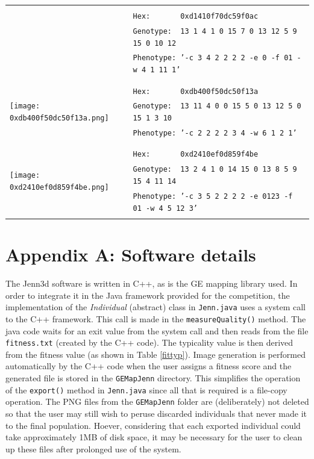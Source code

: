 \documentclass{article}
\begin{document}
\begin{center}
\begin{table}[h!!t]
\begin{tabular}{|l|l|}
		& \\
		& \texttt{Hex:\ \ \ \ \ \ \ 0xd1410f70dc59f0ac}\\
		& \texttt{Genotype:\ \ 13 1 4 1 0 15 7 0 13 12 5 9 15 0 10 12}\\
		& \texttt{Phenotype:\ '-c 3 4 2 2 2 2  -e 0 -f 01 -w 4 1 11 1'}\\
		& \\
		\hline
		\multirow{5}{*}{\texttt{[image: 0xdb400f50dc50f13a.png]}}
		& \\
		& \texttt{Hex:\ \ \ \ \ \ \ 0xdb400f50dc50f13a}\\
		& \texttt{Genotype:\ \ 13 11 4 0 0 15 5 0 13 12 5 0 15 1 3 10}\\
		& \texttt{Phenotype:\ '-c 2 2 2 2 3 4 -w 6 1 2 1'}\\
		& \\
		\hline
		\multirow{5}{*}{\texttt{[image: 0xd2410ef0d859f4be.png]}}
		& \\
		& \texttt{Hex:\ \ \ \ \ \ \ 0xd2410ef0d859f4be}\\
		& \texttt{Genotype:\ \ 13 2 4 1 0 14 15 0 13 8 5 9 15 4 11 14}\\
		& \texttt{Phenotype:\ '-c 3 5 2 2 2 2  -e 0123 -f 01 -w 4 5 12 3'}\\
		& \\
		\hline
	\end{tabular}
	\label{projparams}
	\end{table}
\end{center}




\section*{Appendix A: Software details}

The Jenn3d software is written in C++, as is the GE mapping library used. In
order to integrate it in the Java framework provided for the competition, the
implementation of the \textit{Individual} (abstract) class in \texttt{Jenn.java} uses 
a system call to the C++ framework. This call is made in the \texttt{measureQuality()} 
method. The java code waits for an exit value from the system call and then reads 
from the file \texttt{fitness.txt} (created by the C++ code). The typicality value is then 
derived from the fitness value (as shown in Table \ref{fittyp}). Image generation is 
performed automatically by the C++ code when the user assigns a fitness score and the generated
file is stored in the \texttt{GEMapJenn} directory. This simplifies the operation of the
\texttt{export()} method in \texttt{Jenn.java} since all that is required is a file-copy
operation. The PNG files from the \texttt{GEMapJenn} folder are (deliberately) not deleted so 
that the user may still wish to peruse discarded individuals that never made it to the final population.
Hoever, considering that each exported individual could take approximately 1MB of disk space, it 
may be necessary for the user to clean up these files after prolonged use of the system.
\end{document}
